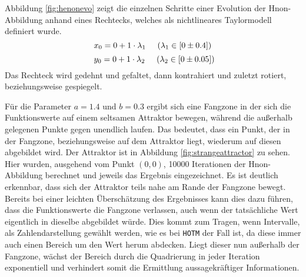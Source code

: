 Abbildung \ref{fig:henonevo} zeigt die einzelnen Schritte einer Evolution der H\e non-Abbildung anhand eines Rechtecks, welches als nichtlineares Taylormodell definiert wurde.
$$x_0 = 0 + 1 \cdot \lambda_1 \hspace{.5cm} (\lambda_1 \in [0 \pm 0.4])$$
$$\ y_0 = 0 + 1 \cdot \lambda_2 \hspace{.5cm} (\lambda_2 \in [0 \pm 0.05])$$
Das Rechteck wird gedehnt und gefaltet, dann kontrahiert und zuletzt rotiert, beziehungsweise gespiegelt. 


Für die Parameter $a=1.4$ und $b=0.3$ ergibt sich eine Fangzone in der sich die Funktionswerte auf einem seltsamen Attraktor bewegen, während die außerhalb gelegenen Punkte gegen unendlich laufen. Das bedeutet, dass ein Punkt, der in der Fangzone, beziehungsweise auf dem Attraktor liegt, wiederum auf diesen abgebildet wird. Der Attraktor ist in Abbildung \ref{fig:strangeattractor} zu sehen. Hier wurden, ausgehend vom Punkt $(0,0)$, 10000 Iterationen der H\e non-Abbildung berechnet und jeweils das Ergebnis eingezeichnet. Es ist deutlich erkennbar, dass sich der Attraktor teils nahe am Rande der Fangzone bewegt. Bereits bei einer leichten Überschätzung des Ergebnisses kann dies dazu führen, dass die Funktionswerte die Fangzone verlassen, auch wenn der tatsächliche Wert eigentlich in dieselbe abgebildet würde. Dies kommt zum Tragen, wenn Intervalle, als Zahlendarstellung gewählt werden, wie es bei \verb+HOTM+ der Fall ist, da diese immer auch einen Bereich um den Wert herum abdecken. Liegt dieser nun außerhalb der Fangzone, wächst der Bereich durch die Quadrierung in jeder Iteration exponentiell und verhindert somit die Ermittlung aussagekräftiger Informationen.






